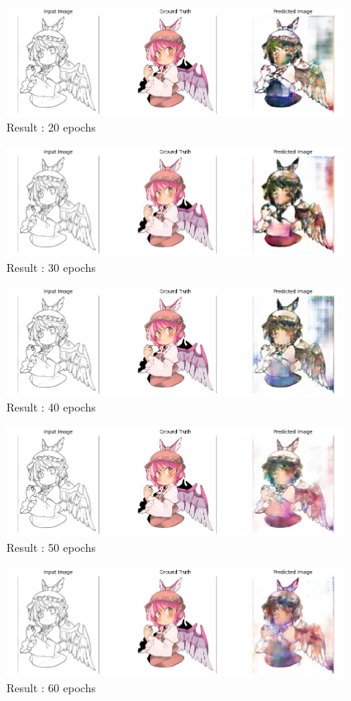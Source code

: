 \documentclass[conference]{IEEEtran}
\begin{document}
\begin{figure}[h]
\centering
\includegraphics[scale = 0.25]{20ep.png}
  \caption{Result : 20 epochs}
\end{figure}

\begin{figure}[h]
\centering
\includegraphics[scale = 0.25]{30ep.png}
  \caption{Result : 30 epochs}
\end{figure}

\begin{figure}[h]
\centering
\includegraphics[scale = 0.25]{40ep.png}
  \caption{Result : 40 epochs}
\end{figure}
\newpage
\begin{figure}[h]
\centering
\includegraphics[scale = 0.25]{50ep.png}
  \caption{Result : 50 epochs}
\end{figure}
\begin{figure}[h]
\centering
\includegraphics[scale = 0.25]{60ep.png}
  \caption{Result : 60 epochs}
\end{figure}
\end{document}
